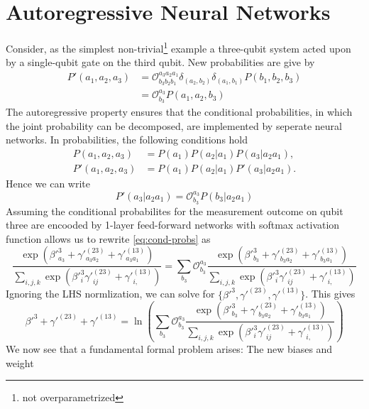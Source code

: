\documentclass[a4]{article}
\begin{document}
\section{Autoregressive Neural Networks}
Consider, as the simplest non-trivial\footnote{not overparametrized} example
a three-qubit system acted upon by a single-qubit gate on the third qubit. New
probabilities are give by
\begin{align*}
    P'(a_1,a_2,a_3) &= \mathcal{O}^{a_3a_2a_1}_{b_3b_2b_1} \delta_{(a_2,b_2)}
                       \delta_{(a_1,b_1)} P(b_1, b_2, b_3) \\
                    &= \mathcal{O}^{a_3}_{b_3} P (a_1, a_2, b_3)
\end{align*}
The autoregressive property ensures that the conditional probabilities, in which
the joint probability can be decomposed, are implemented by seperate neural
networks. In probabilities, the following conditions hold
\begin{align*}
    P(a_1,a_2,a_3) &= P(a_1) P(a_2|a_1)P(a_3|a_2a_1),\\
    P'(a_1,a_2,a_3) &= P(a_1) P(a_2|a_1)P'(a_3|a_2a_1).
\end{align*}
Hence we can write
\begin{equation}
    P'(a_3|a_2a_1) = \mathcal{O}^{a_3}_{b_3} P(b_3|a_2 a_1)
    \label{eq:cond-probs}
\end{equation}
Assuming the conditional probabilites for the measurement outcome on qubit three
are encooded by 1-layer feed-forward networks with softmax activation function
allows us to rewrite \ref{eq:cond-probs} as
\begin{equation*}
    \frac{\exp(\beta'^3_{a_3} + \gamma'^{(23)}_{a_3a_2} +
    \gamma'^{(13)}_{a_3a_1})}{\sum_{i,j,k} \exp(\beta'^3_{i}
    \gamma'^{(23)}_{ij} + \gamma'^{(13)}_{i,})} = \sum_{b_3} \mathcal{O}^{a_3}_{b_3}
    \frac{\exp(\beta'^3_{b_3} + \gamma'^{(23)}_{b_3a_2} +
    \gamma'^{(13)}_{b_3a_1})}{\sum_{i,j,k} \exp(\beta'^3_{i}
    \gamma'^{(23)}_{ij} + \gamma'^{(13)}_{i,})}
\end{equation*}
Ignoring the LHS normlization, we can solve for $\{\beta'^3,\gamma'^{(23)},
\gamma'^{(13)}\}$. This gives
\begin{equation}
  \beta'^3 + \gamma'^{(23)} + \gamma'^{(13)} = \ln( \sum_{b_3}
  \mathcal{O}^{a_3}_{b_3} \frac{\exp(\beta'^3_{b_3} + \gamma'^{(23)}_{b_3a_2} +
  \gamma'^{(13)}_{b_3a_1})}{\sum_{i,j,k} \exp(\beta'^3_{i}
  \gamma'^{(23)}_{ij} + \gamma'^{(13)}_{i,})} )
\end{equation}
We now see that a fundamental formal problem arises: The new biases and weight
\end{document}
